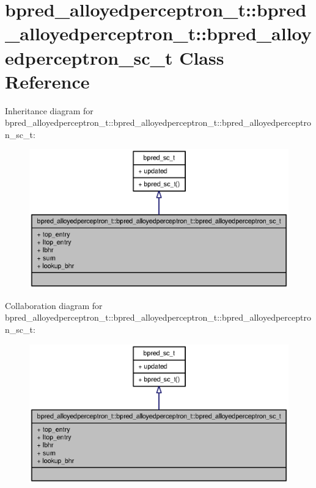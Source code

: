\section{bpred\_\-alloyedperceptron\_\-t::bpred\_\-alloyedperceptron\_\-t::bpred\_\-alloyedperceptron\_\-sc\_\-t Class Reference}
\label{classbpred__alloyedperceptron__t_1_1bpred__alloyedperceptron__sc__t}
Inheritance diagram for bpred\_\-alloyedperceptron\_\-t::bpred\_\-alloyedperceptron\_\-t::bpred\_\-alloyedperceptron\_\-sc\_\-t:\nopagebreak
\begin{figure}[H]
\begin{center}
\leavevmode
\includegraphics[width=400pt]{classbpred__alloyedperceptron__t_1_1bpred__alloyedperceptron__sc__t__inherit__graph}
\end{center}
\end{figure}
Collaboration diagram for bpred\_\-alloyedperceptron\_\-t::bpred\_\-alloyedperceptron\_\-t::bpred\_\-alloyedperceptron\_\-sc\_\-t:\nopagebreak
\begin{figure}[H]
\begin{center}
\leavevmode
\includegraphics[width=400pt]{classbpred__alloyedperceptron__t_1_1bpred__alloyedperceptron__sc__t__coll__graph}
\end{center}
\end{figure}
